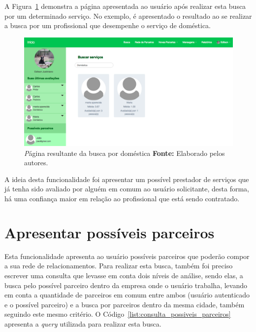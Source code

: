 \par A Figura~\ref{fig:busca_domestica_edilson} demonstra a página apresentada ao usuário após realizar esta busca por um determinado serviço. No exemplo, é apresentado o resultado ao se realizar a busca por um profissional que desempenhe o serviço de doméstica.

\newpage
\begin{figure}[h!]
	\centerline{\includegraphics[scale=0.3]{./imagens/busca-domestica-edilson.png}}
	\caption[\textit Página resultante da busca por doméstica.]
	{\textit Página resultante da busca por doméstica \textbf{Fonte:} Elaborado pelos autores.}
	\label{fig:busca_domestica_edilson}
\end{figure}

\par A ideia desta funcionalidade foi apresentar um possível prestador de serviços que já tenha sido avaliado por alguém em comum ao usuário solicitante, desta forma, há uma confiança maior em relação ao profissional que está sendo contratado.


\section{Apresentar possíveis parceiros}

\par Esta funcionalidade apresenta ao usuário possíveis parceiros que poderão compor a sua rede de relacionamentos. Para realizar esta busca, também foi preciso escrever uma consulta que levasse em conta dois níveis de análise, sendo elas, a busca pelo possível parceiro dentro da empresa onde o usuário trabalha, levando em conta a quantidade de parceiros em comum entre ambos (usuário autenticado e o possível parceiro) e a busca por parceiros dentro da mesma cidade, também seguindo este mesmo critério. O Código~\ref{list:consulta_possiveis_parceiros} apresenta a \textit{query} utilizada para realizar esta busca.

